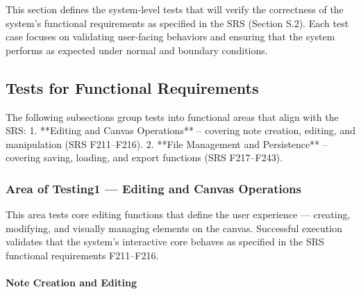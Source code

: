\documentclass[12pt, titlepage]{article}
\begin{document}

This section defines the system-level tests that will verify the correctness of the system’s 
functional requirements as specified in the SRS (Section S.2). Each test case focuses on validating 
user-facing behaviors and ensuring that the system performs as expected under normal and boundary conditions.

\subsection{Tests for Functional Requirements}



The following subsections group tests into functional areas that align with the SRS:  
1. **Editing and Canvas Operations** – covering note creation, editing, and manipulation (SRS F211–F216).  
2. **File Management and Persistence** – covering saving, loading, and export functions (SRS F217–F243).  

\subsubsection{Area of Testing1 — Editing and Canvas Operations}


This area tests core editing functions that define the user experience — creating, modifying, and visually 
managing elements on the canvas. Successful execution validates that the system’s interactive core behaves 
as specified in the SRS functional requirements F211–F216.

\paragraph{Note Creation and Editing}
\end{document}
